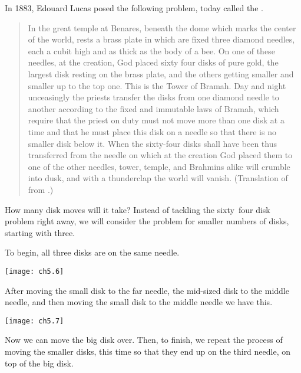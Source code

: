 In 1883, Edouard Lucas posed the following problem,
today called the .
\begin{quotation}
  In the great temple at Benares, beneath the dome which marks the center 
  of the world, rests a brass plate in which are fixed three diamond needles,
  each a cubit high and as thick as the body of a bee.
  On one of these needles, at the creation,
  God placed sixty four disks of pure gold, the largest disk resting on 
  the brass plate, and the others getting smaller and smaller up to the
  top one.
  This is the Tower of Bramah.
  Day and night unceasingly the priests transfer the disks from one diamond
  needle to another according to the fixed and immutable laws of Bramah,
  which require that the priest on duty must not move more than one disk at a 
  time and that he must place this disk on a needle so that there is no
  smaller disk below it.
  When the sixty-four disks shall have been thus transferred from the needle
  on which at the creation God placed them to one of the other needles,
  tower, temple, and Brahmins alike will crumble into dusk, and with
  a thunderclap the world will vanish.
  (Translation of \cite{DeParville} from \cite{Ball}.)
\end{quotation}
How many disk moves will it take?
Instead of tackling the sixty~four disk problem right away, 
we will consider the 
problem for smaller numbers of disks, starting with three.

To begin, all three disks are on the same needle.
\begin{center}
  \texttt{[image: ch5.6]}
\end{center}
After moving the small disk to the far needle, the mid-sized disk to the
middle needle, and then moving the small disk to the middle needle
we have this. 
\begin{center}
  \texttt{[image: ch5.7]}
\end{center}
Now we can  move the big disk over.
Then, to finish, we repeat the process of moving the smaller 
disks, this time so that they end up on the third needle, 
on top of the big disk.

